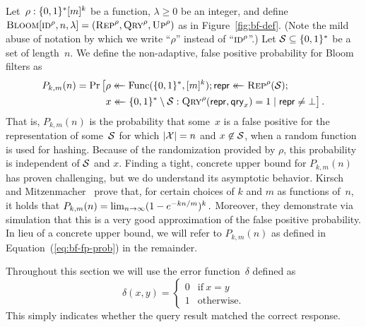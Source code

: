Let~$\rho:\{0,1\}^*[m]^k$ be a function, $\lambda\geq0$ be an integer, and
define $\textnormal{\textsc{Bloom}}[\textnormal{\textsc{id}}^\rho,n,\lambda] = (\textnormal{\textsc{Rep}}^\rho, \textnormal{\textsc{Qry}}^\rho, \textnormal{\textsc{Up}}^\rho)$ as in
Figure~\ref{fig:bf-def}. (Note the mild abuse of notation by which we write
``$\rho$'' instead of ``$\textnormal{\textsc{id}}^\rho$''.)
%
Let $\mathcal{S}\subseteq\{0,1\}^*$ be a set of length~$n$. We define the non-adaptive, false positive
probability for Bloom filters as
\begin{equation}\label{eq:bf-fp-prob}
  \begin{aligned}
    P_{k,m}(n) =
      \Pr\big[&\rho \getsr \Func(\bits^*,[m]^k);
              \pub \getsr \Rep^\rho(\setS); \\
              &x \getsr \bits^*\setminus\setS: \Qry^\rho(\pub, \qry_x) = 1 \given \pub \ne \bot
      \big] \,.
  \end{aligned}
\end{equation}
%
%
That is, $P_{k,m}(n)$ is the probability that some~$x$ is a false positive for
the representation of some~$\mathcal{S}$ for which $|\mathcal{X}|=n$ and $x\not\in\mathcal{S}$,
when a random function is used for hashing. Because of the randomization
provided by $\rho$, this probability is independent of $\mathcal{S}$ and $x$.
%
Finding a tight, concrete upper bound for $P_{k,m}(n)$ has proven challenging,
but we do understand its asymptotic behavior. Kirsch and
Mitzenmacher~\cite{kirsch2006less} prove that, for certain choices of $k$ and
$m$ as functions of~$n$, it holds that
$
  P_{k,m}(n) = \lim_{n{\rightarrow}\infty} (1-e^{-kn/m})^k \,.
$
%
Moreover, they demonstrate via simulation that this is a very good approximation
of the false positive probability.
%
In lieu of a concrete upper bound, we will refer to $P_{k,m}(n)$ as defined in
Equation~(\ref{eq:bf-fp-prob}) in the remainder.

%
Throughout this section we will use the error function~$\delta$ defined as
\begin{equation}
  \delta(x, y) =
  \begin{cases}
    0 & \text{if}\ x=y \\
    1 & \text{otherwise.}
  \end{cases}
\end{equation}
This simply indicates whether the query result matched the correct response.

